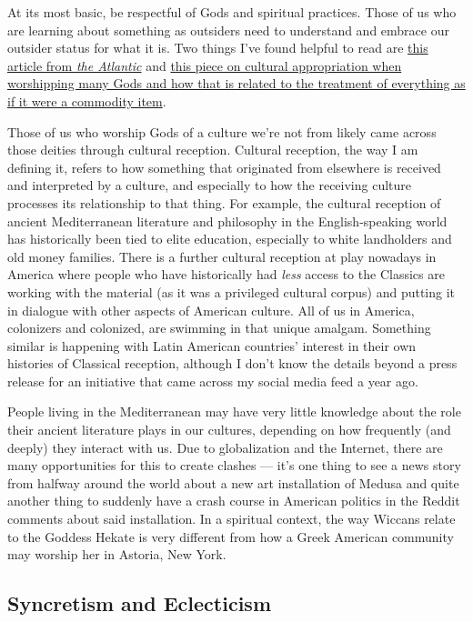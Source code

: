 \documentclass[
]{book}
\begin{document}
At its most basic, be respectful of Gods and spiritual practices. Those of us who are learning about something as outsiders need to understand and embrace our outsider status for what it is. Two things I've found helpful to read are \href{https://www.theatlantic.com/entertainment/archive/2015/10/the-dos-and-donts-of-cultural-appropriation/411292/}{this article from \emph{the Atlantic}} and \href{https://abeautifulresistance.org/site/2021/6/03/plague-of-gods}{this piece on cultural appropriation when worshipping many Gods and how that is related to the treatment of everything as if it were a commodity item}.

Those of us who worship Gods of a culture we're not from likely came across those deities through cultural reception. Cultural reception, the way I am defining it, refers to how something that originated from elsewhere is received and interpreted by a culture, and especially to how the receiving culture processes its relationship to that thing. For example, the cultural reception of ancient Mediterranean literature and philosophy in the English-speaking world has historically been tied to elite education, especially to white landholders and old money families. There is a further cultural reception at play nowadays in America where people who have historically had \emph{less} access to the Classics are working with the material (as it was a privileged cultural corpus) and putting it in dialogue with other aspects of American culture. All of us in America, colonizers and colonized, are swimming in that unique amalgam. Something similar is happening with Latin American countries' interest in their own histories of Classical reception, although I don't know the details beyond a press release for an initiative that came across my social media feed a year ago.

People living in the Mediterranean may have very little knowledge about the role their ancient literature plays in our cultures, depending on how frequently (and deeply) they interact with us. Due to globalization and the Internet, there are many opportunities for this to create clashes --- it's one thing to see a news story from halfway around the world about a new art installation of Medusa and quite another thing to suddenly have a crash course in American politics in the Reddit comments about said installation. In a spiritual context, the way Wiccans relate to the Goddess Hekate is very different from how a Greek American community may worship her in Astoria, New York.

\hypertarget{syncretism-and-eclecticism}{%
\subsection{Syncretism and Eclecticism}\label{syncretism-and-eclecticism}}
\end{document}
